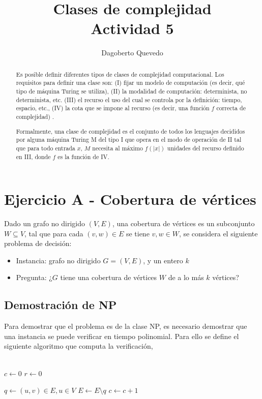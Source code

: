 \documentclass[letterpaper,11pt]{article}
\begin{document}
\title{Clases de complejidad\\\large Actividad 5}
\author{Dagoberto Quevedo}
\maketitle

\begin{abstract}

Es posible definir diferentes tipos de clases de complejidad computacional. Los requisitos para definir una clase son: (I) fijar un modelo de computación (es decir, qué tipo de máquina Turing se utiliza), (II) la modalidad de computación: determinista, no determinista, etc. (III) el recurso el uso del cual se controla por la definición: tiempo, espacio, etc., (IV) la cota que se impone al recurso (es decir, una función $f$  correcta de complejidad) \cite{Schaeffer2020}.

Formalmente, una clase de complejidad es el conjunto de todos los lenguajes decididos por alguna máquina Turing M del tipo I que opera en el modo de operación de II tal que para todo entrada $x$, $M$ necesita al máximo $f(|x|)$ unidades del recurso definido en III, donde $f$ es la función de IV.

\end{abstract}


\section{Ejercicio A - Cobertura de vértices}

Dado un grafo no dirigido $(V,E)$, una cobertura de vértices es un subconjunto $W\subseteq V$, tal que para cada $(v,w)\in E$ se tiene $v,w\in W$, se considera el siguiente problema de decisión:
\begin{itemize}
\item Instancia: grafo no dirigido $G=(V,E)$, y un entero $k$
\item Pregunta: ¿$G$ tiene una cobertura de vértices $W$ de a lo más $k$ vértices? 
\end{itemize}

\subsection{Demostración de NP}

Para demostrar que el problema es de la clase NP, es necesario demostrar que una instancia se puede verificar en tiempo polinomial. Para ello se define el siguiente algoritmo que computa la verificación,
\\
\\
\begin{algorithmic}
\STATE $c\gets 0$
\STATE $r\gets 0$

	\STATE $q \gets {(u,v)\in E, u\in V }$
	\STATE $E \gets E\setminus q$
	\STATE $c \gets c + 1$
	\ENDIF
\ENDFOR
\end{algorithmic}
\end{document}
